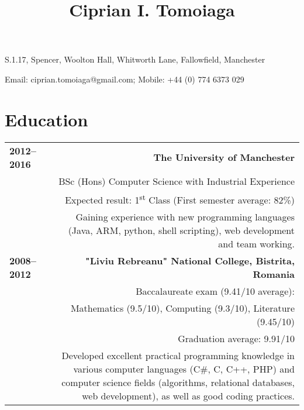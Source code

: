 \documentclass[11pt,a4paper]{article}
\title{\bfseries Ciprian I. Tomoiaga\vspace{-6ex}}
\date{\vspace{-5ex}}       %
\begin{document}
\maketitle
\thispagestyle{empty}

\begin{center}
S.1.17, Spencer, Woolton Hall, Whitworth Lane, Fallowfield, Manchester

Email: ciprian.tomoiaga@gmail.com; Mobile: +44 (0) 774 6373 029\vspace{-2ex}
\end{center}

\section*{Education\vspace{-2ex}}
\begin{tabular}{LR}
\bf 2012--2016&{\bf The University of Manchester}\\
&BSc (Hons) Computer Science with Industrial Experience\\
&Expected result: 1\textsuperscript{st} Class (First semester average: 82\%)\\
&Gaining experience with new programming languages (Java, ARM, python, shell scripting), web development and team working.\vspace{5pt}\\
\bf 2008--2012&\bf"Liviu Rebreanu" National College, Bistrita, Romania\\ 
&Baccalaureate exam (9.41/10 average):\\
&Mathematics (9.5/10), Computing (9.3/10), Literature (9.45/10)\vspace{5pt}\\
&Graduation average: 9.91/10\vspace{5pt}\\
&Developed excellent practical programming knowledge in various computer languages (C\#, C, C++, PHP) and computer science fields (algorithms, relational databases, web development), as well as good coding practices.\vspace{-2ex}\\

\end{tabular}
\end{document}
